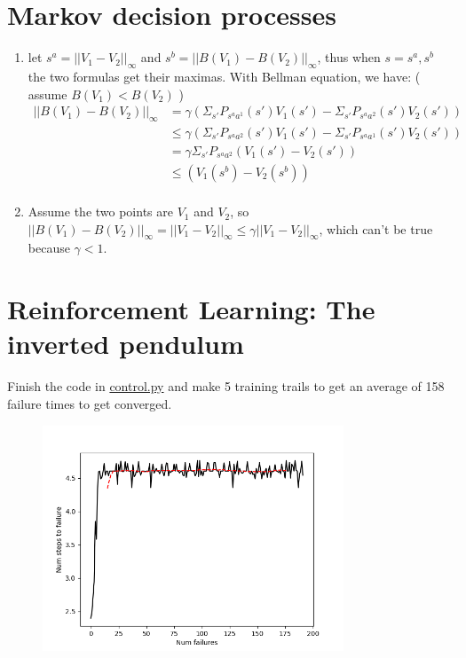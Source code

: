 \documentclass[12pt]{article}
\begin{document}
    \newpage
    \section*{Markov decision processes}
    \begin{enumerate}[label=(\alph*)]
        \item let $s^a = ||V_1-V_2||_\infty$ and  $s^b = ||B(V_1)-B(V_2)||_\infty$, thus when $s=s^a,s^b$ the two formulas get their maximas.
        With Bellman equation, we have: ( assume $B(V_1)<B(V_2)$ )
        \begin{equation*}
            \begin{split}
                ||B(V_1)-B(V_2)||_\infty &= \gamma (\Sigma_{s'} P_{s^a a^1}(s')V_1(s') - \Sigma_{s'} P_{s^a a^2}(s')V_2(s') ) \\
                &\leq \gamma (\Sigma_{s'} P_{s^a a^2}(s')V_1(s') - \Sigma_{s'} P_{s^a a^1}(s')V_2(s') ) \\
                &=\gamma \Sigma_{s'} P_{s^a a^2}(V_1(s') -V_2(s')) \\
                &\leq (V_1(s^b)-V_2(s^b))  \\
            \end{split}
        \end{equation*}
        \item Assume the two points are $V_1$ and $V_2$, so $||B(V_1)-B(V_2)||_\infty = ||V_1-V_2||_\infty \leq \gamma||V_1-V_2||_\infty$, 
        which can't be true because $\gamma < 1$.
    \end{enumerate}

    \section*{Reinforcement Learning: The inverted pendulum }
    Finish the code in \href{https://github.com/zyxue/stanford-cs229/blob/master/Problem-set-4/6-reinforcement-learning-the-inverted-pendulum/control.py}{control.py}
    and make 5 training trails to get an average of 158 failure times to get converged.
    \begin{figure}[h]
        \centering
        \includegraphics[width=0.8\textwidth]{Q6/192.png}
    \end{figure}
\end{document}
